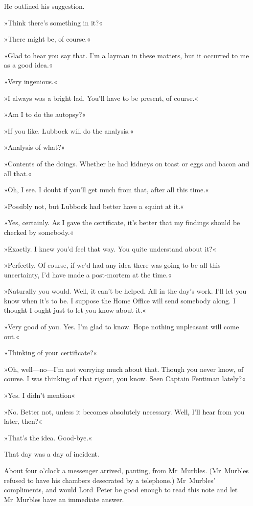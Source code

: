 He outlined his suggestion.

»Think there's something in it?«

»There might be, of course.«

»Glad to hear you say that. I'm a layman in these matters, but it occurred to me as a good idea.«

»Very ingenious.«

»I always was a bright lad. You'll have to be present, of course.«

»Am I to do the autopsy?«

»If you like. Lubbock will do the analysis.«

»Analysis of what?«

»Contents of the doings. Whether he had kidneys on toast or eggs and bacon and all that.«

»Oh, I see. I doubt if you'll get much from that, after all this time.«

»Possibly not, but Lubbock had better have a squint at it.«

»Yes, certainly. As I gave the certificate, it's better that my findings should be checked by somebody.«

»Exactly. I knew you'd feel that way. You quite understand about it?«

»Perfectly. Of course, if we'd had any idea there was going to be all this uncertainty, I'd have made a post-mortem at the time.«

»Naturally you would. Well, it can't be helped. All in the day's work. I'll let you know when it's to be. I suppose the Home Office will send somebody along. I thought I ought just to let you know about it.«

»Very good of you. Yes. I'm glad to know. Hope nothing unpleasant will come out.«

»Thinking of your certificate?«

»Oh, well—no—I'm not worrying much about that. Though you never know, of course. I was thinking of that rigour, you know. Seen Captain Fentiman lately?«

»Yes. I didn't mention\longdash«

»No. Better not, unless it becomes absolutely necessary. Well, I'll hear from you later, then?«

»That's the idea. Good-bye.«

That day was a day of incident.

About four o'clock a messenger arrived, panting, from Mr~Murbles. (Mr~Murbles refused to have his chambers desecrated by a telephone.) Mr~Murbles' compliments, and would Lord~Peter be good enough to read this note and let Mr~Murbles have an immediate answer.

